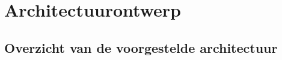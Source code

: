 \chapter{Architectuurontwerp}
\label{chap:architectuur}









\section{Overzicht van de voorgestelde architectuur}
\label{sec:architectuur-overzicht}

